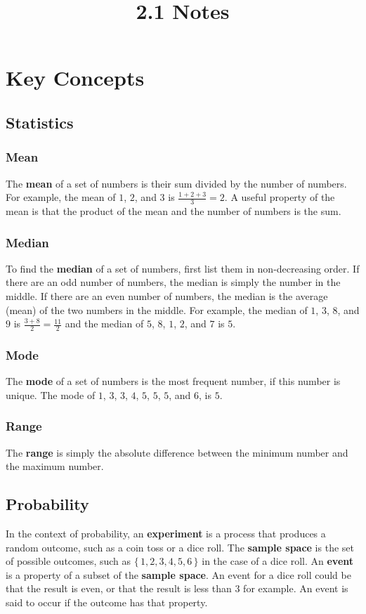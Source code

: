 \documentclass[twocolumn]{article}
\title{2.1 Notes}
\author{}
\date{}
\begin{document}
\maketitle

\section*{Key Concepts}

\subsection*{Statistics}

\subsubsection*{Mean}
The \textbf{mean} of a set of numbers is their sum divided by the number of
numbers. For example, the mean of $1$, $2$, and $3$ is $\frac{1 + 2 + 3}{3}
= 2$. A useful property of the mean is that the product of the mean and the
number of numbers is the sum.

\subsubsection*{Median}
To find the \textbf{median} of a set of numbers, first list them in
non-decreasing order. If there are an odd number of numbers, the median is
simply the number in the middle. If there are an even number of numbers, the
median is the average (mean) of the two numbers in the middle. For example,
the median of $1$, $3$, $8$, and $9$ is $\frac{3 + 8}{2} = \frac{11}{2}$ and
the median of $5$, $8$, $1$, $2$, and $7$ is $5$.

\subsubsection*{Mode}
The \textbf{mode} of a set of numbers is the most frequent number, if this
number is unique. The mode of $1$, $3$, $3$, $4$, $5$, $5$, $5$, and $6$, is
$5$.

\subsubsection*{Range}
The \textbf{range} is simply the absolute difference between the minimum
number and the maximum number.

\subsection*{Probability}
In the context of probability, an \textbf{experiment} is a process that
produces a random outcome, such as a coin toss or a dice roll. The
\textbf{sample space} is the set of possible outcomes, such as $\{\, 1, 2,
3, 4, 5, 6 \,\}$ in the case of a dice roll. An \textbf{event} is a property
of a subset of the \textbf{sample space}. An event for a dice roll could be
that the result is even, or that the result is less than $3$ for example. An
event is said to occur if the outcome has that property.
\end{document}
